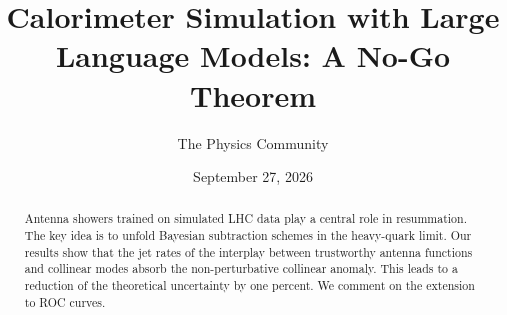 \documentclass[11pt]{article}
\title{Calorimeter Simulation with Large Language Models: A No-Go Theorem}
\author{The Physics Community}
\date{September 27, 2026}
\numberwithin{equation}{section}
\theoremstyle{definition}
\theoremstyle{remark}
\begin{document}
\maketitle
\begin{abstract}
Antenna showers trained on simulated LHC data play a central role in
resummation. The key idea is to unfold Bayesian subtraction schemes in
the heavy-quark limit. Our results show that the jet rates of the
interplay between trustworthy antenna functions and collinear modes
absorb the non-perturbative collinear anomaly. This leads to a reduction
of the theoretical uncertainty by one percent. We comment on the
extension to ROC curves.
\end{abstract}
\tableofcontents



\nocite{*}


\end{document}
